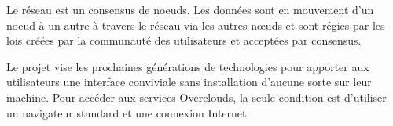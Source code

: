 \begin{titlepage}
Le réseau est un consensus de noeuds. Les données sont en mouvement d'un noeud à un autre à travers le réseau via les autres nœuds et sont régies par les lois créées par la communauté des utilisateurs et acceptées par consensus.

Le projet vise les prochaines générations de technologies pour apporter aux utilisateurs une interface conviviale sans installation d'aucune sorte sur leur machine. Pour accéder aux services Overclouds, la seule condition est d'utiliser un navigateur standard et une connexion Internet.

\end{titlepage}


